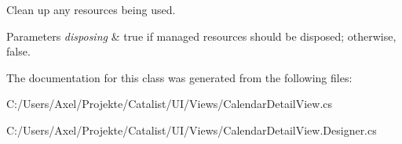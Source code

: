 Clean up any resources being used. 


\begin{DoxyParams}{Parameters}
{\em disposing} & true if managed resources should be disposed; otherwise, false.\\
\hline
\end{DoxyParams}


The documentation for this class was generated from the following files\+:\begin{DoxyCompactItemize}
\item 
C\+:/\+Users/\+Axel/\+Projekte/\+Catalist/\+U\+I/\+Views/Calendar\+Detail\+View.\+cs\item 
C\+:/\+Users/\+Axel/\+Projekte/\+Catalist/\+U\+I/\+Views/Calendar\+Detail\+View.\+Designer.\+cs\end{DoxyCompactItemize}

